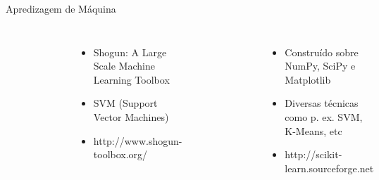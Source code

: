 \documentclass[12pt,t,graphics]{beamer}
\begin{document}
\begin{frame}[t]{Apredizagem de Máquina}
	\begin{columns}
		\vspace{-0.5cm}
		\begin{figure}
			\centering
			\includegraphics[scale=0.25]{img/shogun_logo.png}
		\end{figure}
		\begin{itemize}
			\item Shogun: A Large Scale Machine Learning Toolbox
			\item SVM (Support Vector Machines)
			\item http://www.shogun-toolbox.org/
		\end{itemize}
		\vspace{-1.25cm}
		\begin{figure}
			\centering
			\includegraphics[scale=0.4]{img/logo_scikit-learn.png}
		\end{figure}
		\begin{itemize}
			\item Construído sobre NumPy, SciPy e Matplotlib
			\item Diversas técnicas como p. ex. SVM, K-Means, etc
			\item http://scikit-learn.sourceforge.net
		\end{itemize}
	\end{columns}
	
\end{frame}
\end{document}
